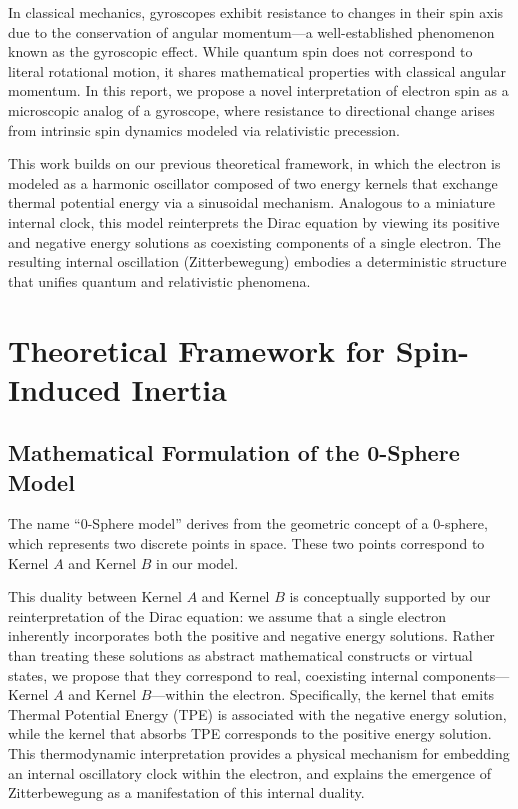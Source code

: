 \documentclass[%
 reprint,
 amsmath,amssymb,
 aps,
]{revtex4-1}
\numberwithin{equation}{section}%
\begin{document}
In classical mechanics, gyroscopes exhibit resistance to changes in their spin axis due to the conservation of angular momentum—a well-established phenomenon known as the gyroscopic effect. While quantum spin does not correspond to literal rotational motion, it shares mathematical properties with classical angular momentum. In this report, we propose a novel interpretation of electron spin as a microscopic analog of a gyroscope, where resistance to directional change arises from intrinsic spin dynamics modeled via relativistic precession.

This work builds on our previous theoretical framework, in which the electron is modeled as a harmonic oscillator composed of two energy kernels that exchange thermal potential energy via a sinusoidal mechanism. Analogous to a miniature internal clock, this model reinterprets the Dirac equation by viewing its positive and negative energy solutions as coexisting components of a single electron. The resulting internal oscillation (Zitterbewegung) embodies a deterministic structure that unifies quantum and relativistic phenomena.

\section{Theoretical Framework for Spin-Induced Inertia}

\subsection{Mathematical Formulation of the 0-Sphere Model}
\label{ref:MathematicalFormulation}

The name ``0-Sphere model'' derives from the geometric concept of a 0-sphere, which represents two discrete points in space. These two points correspond to Kernel $A$ and Kernel $B$ in our model.

This duality between Kernel $A$ and Kernel $B$ is conceptually supported by our reinterpretation of the Dirac equation: we assume that a single electron inherently incorporates both the positive and negative energy solutions. Rather than treating these solutions as abstract mathematical constructs or virtual states, we propose that they correspond to real, coexisting internal components---Kernel $A$ and Kernel $B$---within the electron. Specifically, the kernel that emits Thermal Potential Energy (TPE) is associated with the negative energy solution, while the kernel that absorbs TPE corresponds to the positive energy solution. This thermodynamic interpretation provides a physical mechanism for embedding an internal oscillatory clock within the electron, and explains the emergence of Zitterbewegung as a manifestation of this internal duality.
\end{document}
